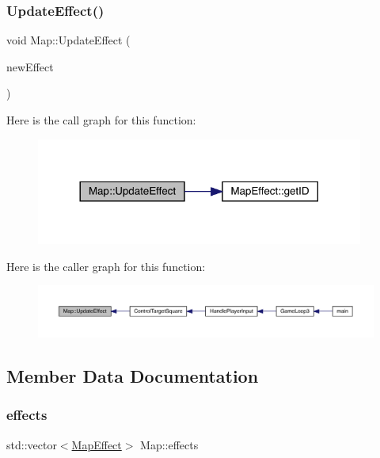 \subsubsection{\texorpdfstring{Update\+Effect()}{UpdateEffect()}}
{\footnotesize\ttfamily void Map\+::\+Update\+Effect (\begin{DoxyParamCaption}\item[{\mbox{\hyperlink{class_map_effect}{Map\+Effect}}}]{new\+Effect }\end{DoxyParamCaption})}

Here is the call graph for this function\+:
\nopagebreak
\begin{figure}[H]
\begin{center}
\leavevmode
\includegraphics[width=305pt]{class_map_a7ba59d3c72accc7e8af4624f8e0abe69_cgraph}
\end{center}
\end{figure}
Here is the caller graph for this function\+:
\nopagebreak
\begin{figure}[H]
\begin{center}
\leavevmode
\includegraphics[width=350pt]{class_map_a7ba59d3c72accc7e8af4624f8e0abe69_icgraph}
\end{center}
\end{figure}


\subsection{Member Data Documentation}
\mbox{\label{class_map_adba7c06f06362ce22f16be96a723dcaf}} 
\subsubsection{\texorpdfstring{effects}{effects}}
{\footnotesize\ttfamily std\+::vector$<$\mbox{\hyperlink{class_map_effect}{Map\+Effect}}$>$ Map\+::effects}

